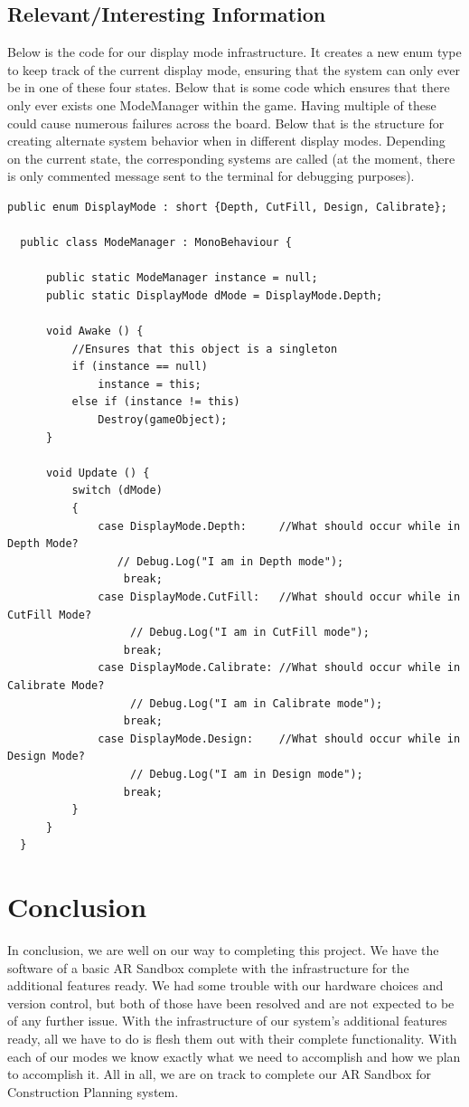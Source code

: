 \documentclass[onecolumn, draftclsnofoot,10pt, compsoc]{IEEEtran}
\begin{document}
\subsection{Relevant/Interesting Information}
Below is the code for our display mode infrastructure.  It creates a new enum type to keep track of the current display mode, ensuring that the system can only ever be in one of these four states.  Below that is some code which ensures that there only ever exists one ModeManager within the game.  Having multiple of these could cause numerous failures across the board.  Below that is the structure for creating alternate system behavior when in different display modes. Depending on the current state, the corresponding systems are called (at the moment, there is only commented message sent to the terminal for debugging purposes).
\begin{lstlisting}[caption=Code for the system's mode manager., label=lst:UI,captionpos=b]
  public enum DisplayMode : short {Depth, CutFill, Design, Calibrate};

  public class ModeManager : MonoBehaviour {

      public static ModeManager instance = null;
      public static DisplayMode dMode = DisplayMode.Depth;

      void Awake () {
          //Ensures that this object is a singleton
          if (instance == null)
              instance = this;
          else if (instance != this)
              Destroy(gameObject);
      }
      
      void Update () {
          switch (dMode)
          {
              case DisplayMode.Depth:     //What should occur while in Depth Mode?
                 // Debug.Log("I am in Depth mode");
                  break;
              case DisplayMode.CutFill:   //What should occur while in CutFill Mode?
                   // Debug.Log("I am in CutFill mode");
                  break;
              case DisplayMode.Calibrate: //What should occur while in Calibrate Mode?
                   // Debug.Log("I am in Calibrate mode");
                  break;
              case DisplayMode.Design:    //What should occur while in Design Mode?
                   // Debug.Log("I am in Design mode");
                  break;
          }
      }
  }
\end{lstlisting}

\section{Conclusion}
In conclusion, we are well on our way to completing this project.  We have the software of a basic AR Sandbox complete with the infrastructure for the additional features ready.  We had some trouble with our hardware choices and version control, but both of those have been resolved and are not expected to be of any further issue.  With the infrastructure of our system's additional features ready, all we have to do is flesh them out with their complete functionality.  With each of our modes we know exactly what we need to accomplish and how we plan to accomplish it.  All in all, we are on track to complete our AR Sandbox for Construction Planning system.
\end{document}

